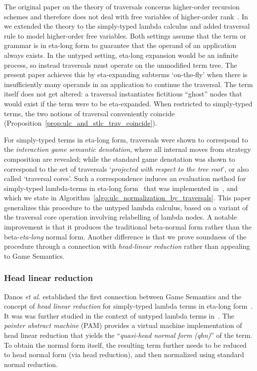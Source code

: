 \documentclass{elsarticle}
\makeatletter
\theoremstyle{plain}
\theoremstyle{definition}
\theoremstyle{remark}
\def\etal{\textit{et al.}\@\xspace}
\makeatother
\begin{document}
The original paper on the theory of traversals concerns higher-order recursion schemes and therefore does not deal with free variables of higher-order rank~\cite{OngLics2006}. In~\cite{BlumPhd} we extended the theory to the simply-typed lambda calculus and added traversal rule to model higher-order free variables. Both settings assume that the term or grammar is in eta-long form to guarantee that the operand of an application always exists.
In the untyped setting, eta-long expansion would be an infinite process, so instead traversals must operate on the unmodified term tree.
The present paper achieves this by eta-expanding subterms `on-the-fly' when there is insufficiently many operands in an application to continue the traversal. The term itself does not get altered: a traversal instantiates fictitious ``ghost'' nodes that would exist if the term were to be eta-expanded.
When restricted to simply-typed terms, the two notions of traversal conveniently coincide (Proposition~\ref{prop:ulc_and_stlc_trav_coincide}).

For simply-typed terms in eta-long form, traversals were shown to correspond to the \emph{interaction game semantic denotation}, where all internal moves from strategy composition are revealed; while the standard game denotation was shown to correspond to the set of traversals `\emph{projected with respect to the tree root}', or also called `traversal cores'. Such a correspondence induces an evaluation method for simply-typed lambda-terms in eta-long form~\cite{BlumPhd,BlumGalop2008,Ong-NormByTrav2015} that was implemented in~\cite{Blum-HogTool}, and which we state in Algorithm~\ref{algo:ulc_normalization_by_traversals}. This paper generalizes this procedure to the untyped lambda calculus, based on a variant of the traversal core operation involving relabelling of lambda nodes. A notable improvement is that it produces the traditional beta-normal form rather than the beta-\emph{eta-long} normal form. Another difference is that we prove soundness of the procedure through a connection with \emph{head-linear reduction} rather than appealing to Game Semantics.

\subsubsection{Head linear reduction}
Danos \etal established the first connection between Game Semantics and the concept of \emph{head linear reduction} for simply-typed lambda terms in eta-long form~\cite{danosherbelinregnier1996}. It was was further studied in the context of untyped lambda terms in~\cite{danos-head}. The \emph{pointer abstract machine} (PAM) provides a virtual machine implementation of head linear reduction that yields the ``\emph{quasi-head normal form (qhn)}'' of the term. To obtain the normal form itself, the resulting term further needs to be reduced to head normal form (via head reduction), and then normalized using standard normal reduction.
\end{document}
